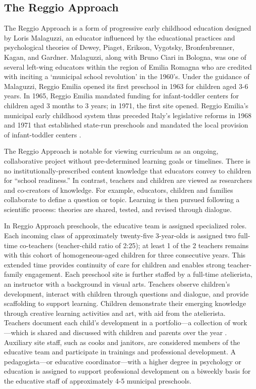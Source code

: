 \subsection{The Reggio Approach}

The Reggio Approach is a form of progressive early childhood education designed by Loris Malaguzzi, an educator influenced by the educational practices and psychological theories of Dewey, Piaget, Erikson, Vygotsky, Bronfenbrenner, Kagan, and Gardner. Malaguzzi, along with Bruno Ciari in Bologna, was one of several left-wing educators within the region of Emilia Romagna who are credited with inciting a `municipal school revolution' in the 1960's. Under the guidance of Malaguzzi, Reggio Emilia opened its first preschool in 1963 for children aged 3-6 years. In 1965, Reggio Emilia mandated funding for infant-toddler centers for children aged 3 months to 3 years; in 1971, the first site opened. Reggio Emilia's municipal early childhood system thus preceded Italy's legislative reforms in 1968 and 1971 that established state-run preschools and mandated the local provision of infant-toddler centers \citep{Cagliari-etal-eds_2016_BOOK_Loris-Malaguzzi}. 

The Reggio Approach is notable for viewing curriculum as an ongoing, collaborative project without pre-determined learning goals or timelines. There is no institutionally-prescribed content knowledge that educators convey to children for ``school readiness.'' In contrast, teachers and children are viewed as researchers and co-creators of knowledge. For example, educators, children and families collaborate to define a question or topic. Learning is then pursued following a scientific process: theories are shared, tested, and revised through dialogue. 

In Reggio Approach preschools, the educative team is assigned specialized roles. Each incoming class of approximately twenty-five 3-year-olds is assigned two full-time co-teachers (teacher-child ratio of 2:25); at least 1 of the 2 teachers remains with this cohort of homogeneous-aged children for three consecutive years. This extended time provides continuity of care for children and enables strong teacher-family engagement. Each preschool site is further staffed by a full-time atelierista, an instructor with a background in visual arts. Teachers observe children's development, interact with children through questions and dialogue, and provide scaffolding to support learning. Children demonstrate their emerging knowledge through creative learning activities and art, with aid from the atelierista. Teachers document each child's development in a portfolio---a collection of work---which is shared and discussed with children and parents over the year \citep{Rinaldi_2006_ReggioEmilia_BOOK,Giudici-Nicolosi_2014_Reggio-Approach}. Auxiliary site staff, such as cooks and janitors, are considered members of the educative team and participate in trainings and professional development. A pedagogista---or educative coordinator---with a higher degree in psychology or education is assigned to support professional development on a biweekly basis for the educative staff of approximately 4-5 municipal preschools. 

